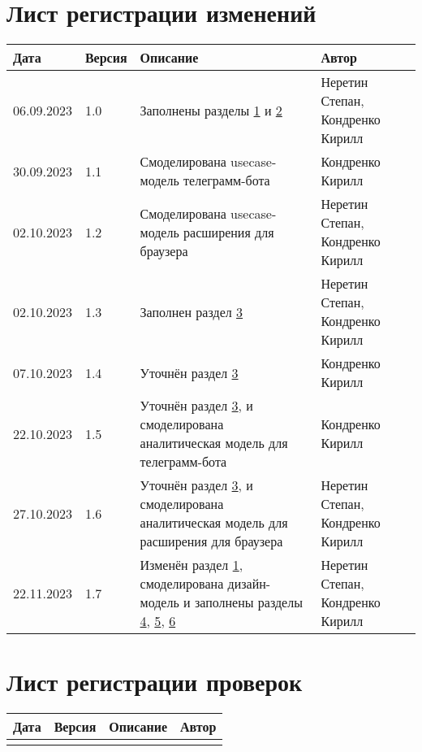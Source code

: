 \chapter*{Лист регистрации изменений}
	\begin{tabularx}{\textwidth}{
			| >{\centering\arraybackslash\hsize=2cm}X
			| >{\centering\arraybackslash\hsize=1.5cm}X
			| >{\centering\arraybackslash}X
			| >{\centering\arraybackslash\hsize=5cm}X
			|}
		\hline
		\textbf{Дата} & \textbf{Версия} & \textbf{Описание} & \textbf{Автор} \\\hline
		
		06.09.2023 & 1.0 & Заполнены разделы \hyperref[chapter1]{1} и \hyperref[chapter2]{2} & Неретин Степан, Кондренко Кирилл \\\hline
		
		30.09.2023 & 1.1 & Смоделирована usecase-модель телеграмм-бота & Кондренко Кирилл \\\hline
		
		02.10.2023 & 1.2 & Смоделирована usecase-модель расширения для браузера & Неретин Степан, Кондренко Кирилл \\\hline
		
		02.10.2023 & 1.3 & Заполнен раздел \hyperref[chapter3]{3} & Неретин Степан, Кондренко Кирилл \\\hline
		

		07.10.2023 & 1.4 & Уточнён раздел \hyperref[chapter3]{3} & Кондренко Кирилл \\\hline

		22.10.2023 & 1.5 & Уточнён раздел \hyperref[chapter3]{3}, и смоделирована аналитическая модель для телеграмм-бота & Кондренко Кирилл \\\hline
		
		27.10.2023 & 1.6 & Уточнён раздел \hyperref[chapter3]{3}, и смоделирована аналитическая модель для расширения для браузера & Неретин Степан, Кондренко Кирилл \\\hline
		
		22.11.2023 & 1.7 & Изменён раздел \hyperref[chapter1]{1}, смоделирована дизайн-модель и заполнены разделы \hyperref[chapter4]{4}, \hyperref[chapter5]{5}, \hyperref[chapter6]{6}  & Неретин Степан, Кондренко Кирилл \\\hline
	\end{tabularx}
\chapter*{Лист регистрации проверок}
	\begin{tabularx}{\textwidth}{
			| >{\centering\arraybackslash\hsize=2cm}X
			| >{\centering\arraybackslash\hsize=1.5cm}X
			| >{\centering\arraybackslash}X
			| >{\centering\arraybackslash\hsize=5cm}X
			|}
		\hline
		\textbf{Дата} & \textbf{Версия} & \textbf{Описание} & \textbf{Автор} \\\hline
		&&& \\\hline
	\end{tabularx}
